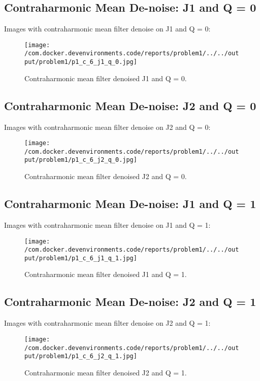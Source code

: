 \documentclass{article}%
\begin{document}
%
\subsection{Contraharmonic Mean De{-}noise: J1 and Q = 0}%
\label{subsec:ContraharmonicMeanDe{-}noiseJ1andQ=0}%
Images with contraharmonic mean filter denoise on J1 and Q = 0:%


\begin{figure}[h!]%
\centering%
\texttt{[image: /com.docker.devenvironments.code/reports/problem1/../../output/problem1/p1\_c\_6\_j1\_q\_0.jpg]}%
\caption{Contraharmonic mean filter denoised J1 and Q = 0.}%
\end{figure}

%
\subsection{Contraharmonic Mean De{-}noise: J2 and Q = 0}%
\label{subsec:ContraharmonicMeanDe{-}noiseJ2andQ=0}%
Images with contraharmonic mean filter denoise on J2 and Q = 0:%


\begin{figure}[h!]%
\centering%
\texttt{[image: /com.docker.devenvironments.code/reports/problem1/../../output/problem1/p1\_c\_6\_j2\_q\_0.jpg]}%
\caption{Contraharmonic mean filter denoised J2 and Q = 0.}%
\end{figure}

%
\subsection{Contraharmonic Mean De{-}noise: J1 and Q = 1}%
\label{subsec:ContraharmonicMeanDe{-}noiseJ1andQ=1}%
Images with contraharmonic mean filter denoise on J1 and Q = 1:%


\begin{figure}[h!]%
\centering%
\texttt{[image: /com.docker.devenvironments.code/reports/problem1/../../output/problem1/p1\_c\_6\_j1\_q\_1.jpg]}%
\caption{Contraharmonic mean filter denoised J1 and Q = 1.}%
\end{figure}

%
\subsection{Contraharmonic Mean De{-}noise: J2 and Q = 1}%
\label{subsec:ContraharmonicMeanDe{-}noiseJ2andQ=1}%
Images with contraharmonic mean filter denoise on J2 and Q = 1:%


\begin{figure}[h!]%
\centering%
\texttt{[image: /com.docker.devenvironments.code/reports/problem1/../../output/problem1/p1\_c\_6\_j2\_q\_1.jpg]}%
\caption{Contraharmonic mean filter denoised J2 and Q = 1.}%
\end{figure}
\end{document}
